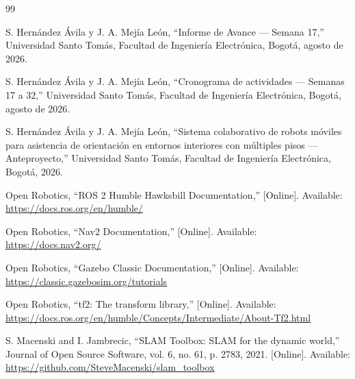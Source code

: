 \documentclass[12pt,letterpaper]{article}
\begin{document}
\begin{thebibliography}{99}

S. Hernández Ávila y J. A. Mejía León,
``Informe de Avance --- Semana 17,''
Universidad Santo Tomás, Facultad de Ingeniería Electrónica, Bogotá, agosto de 2026.

S. Hernández Ávila y J. A. Mejía León,
``Cronograma de actividades --- Semanas 17 a 32,''
Universidad Santo Tomás, Facultad de Ingeniería Electrónica, Bogotá, agosto de 2026.

S. Hernández Ávila y J. A. Mejía León,
``Sistema colaborativo de robots móviles para asistencia de orientación en entornos interiores con múltiples pisos --- Anteproyecto,''
Universidad Santo Tomás, Facultad de Ingeniería Electrónica, Bogotá, 2026.

Open Robotics,
``ROS 2 Humble Hawksbill Documentation,''
[Online]. Available: \url{https://docs.ros.org/en/humble/}

Open Robotics,
``Nav2 Documentation,''
[Online]. Available: \url{https://docs.nav2.org/}

Open Robotics,
``Gazebo Classic Documentation,''
[Online]. Available: \url{https://classic.gazebosim.org/tutorials}

Open Robotics,
``tf2: The transform library,''
[Online]. Available: \url{https://docs.ros.org/en/humble/Concepts/Intermediate/About-Tf2.html}

S. Macenski and I. Jambrecic,
``SLAM Toolbox: SLAM for the dynamic world,''
Journal of Open Source Software, vol. 6, no. 61, p. 2783, 2021. [Online]. Available: \url{https://github.com/SteveMacenski/slam_toolbox}

\end{thebibliography}
\end{document}
